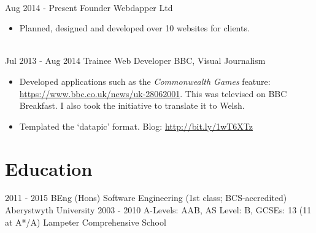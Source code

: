 \documentclass[letterpaper]{twentysecondcv} %
\begin{document}
\begin{twenty}
{{\begin{itemize}
    \end{itemize}}
        }
     \\
     \twentyitem
   		{Aug 2014 -}
		{Present}
        {Founder}
        {Webdapper Ltd}
        {}
        {
        \begin{itemize}
        \item Planned, designed and developed over 10 websites for clients.
    \end{itemize}
    	}
    \\
    \twentyitem
   		{Jul 2013 -}
		{Aug 2014}
        {Trainee Web Developer}
        {BBC, Visual Journalism}
        {}
        {
        {\begin{itemize}
        \item Developed applications such as the \emph{Commonwealth Games} feature: \url{https://www.bbc.co.uk/news/uk-28062001}. This was televised on BBC Breakfast. I also took the initiative to translate it to Welsh.
        \item Templated the ‘datapic’ format. Blog: \url{http://bit.ly/1wT6XTz}
    \end{itemize}}
        }

\end{twenty}

\section{Education}

\begin{twenty} %
	\twentyitem
    	{2011 - 2015}
        {}
        {BEng (Hons) Software Engineering \textnormal{(1st class; BCS-accredited)}}
        {}
        {Aberystwyth University}
        {}
	\twentyitem
    	{2003 - 2010}
		{}
        {A-Levels: \textnormal{AAB}, AS Level: \textnormal{B}, GCSEs: \textnormal{13 (11 at A*/A)}
        }
        {}
        {Lampeter Comprehensive School}
        {}
\end{twenty}
\end{document}
